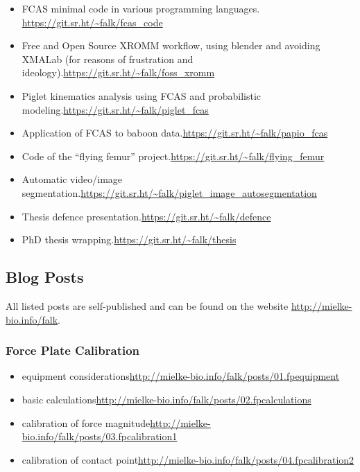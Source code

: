\begin{change}
\begin{itemize}
\item FCAS minimal code in various programming languages. \newline \url{https://git.sr.ht/\~falk/fcas\_code}
\item Free and Open Source XROMM workflow, using blender and avoiding XMALab (for reasons of frustration and ideology).\newline \url{https://git.sr.ht/\~falk/foss\_xromm}
\item Piglet kinematics analysis using FCAS and probabilistic modeling.\newline \url{https://git.sr.ht/\~falk/piglet\_fcas}
\item Application of FCAS to baboon data.\newline \url{https://git.sr.ht/\~falk/papio\_fcas}
\item Code of the ``flying femur'' project.\newline \url{https://git.sr.ht/\~falk/flying\_femur}
\item Automatic video/image segmentation.\newline \url{https://git.sr.ht/\~falk/piglet\_image\_autosegmentation}
\item Thesis defence presentation.\newline \url{https://git.sr.ht/\~falk/defence}
\item PhD thesis wrapping.\newline \url{https://git.sr.ht/\~falk/thesis}
\end{itemize}
\subsection{Blog Posts}
\label{sec:org55b0e74}
All listed posts are self-published and can be found on the website \newline\url{http://mielke-bio.info/falk}.
\subsubsection{Force Plate Calibration}
\label{sec:org1101dcb}
\begin{itemize}
\item equipment considerations\newline \url{http://mielke-bio.info/falk/posts/01.fpequipment}
\item basic calculations\newline \url{http://mielke-bio.info/falk/posts/02.fpcalculations}
\item calibration of force magnitude\newline \url{http://mielke-bio.info/falk/posts/03.fpcalibration1}
\item calibration of contact point\newline \url{http://mielke-bio.info/falk/posts/04.fpcalibration2}
\end{itemize}

\end{change}
